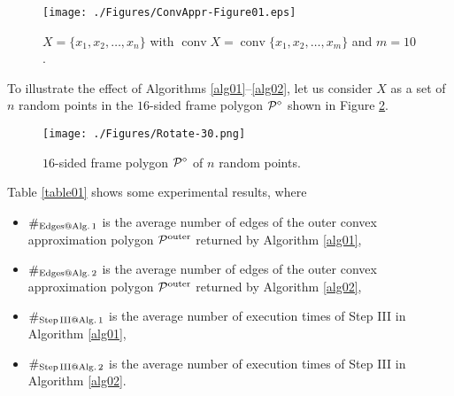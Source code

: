 \documentclass[12pt]{article}
\DeclareMathOperator{\conv}{conv}
\begin{document}
\begin{figure}[ht]
	\centering
	\texttt{[image: ./Figures/ConvAppr-Figure01.eps]}
	\caption{$X = \{x_1, x_2, \dots, x_n\}$ with $\conv X = \conv\{x_1, x_2, \dots, x_m\}$ and $m = 10$.}
	\label{Figure01}
\end{figure}



To illustrate the effect of Algorithms \ref{alg01}--\ref{alg02}, let us consider $X$ as a set of $n$ random points in the $16$-sided frame polygon ${\cal P}^\diamond$ shown in Figure \ref{Figure02}.

\begin{figure}[ht]
	\centering
    \texttt{[image: ./Figures/Rotate-30.png]}
	\caption{$16$-sided frame polygon ${\cal P}^\diamond$ of $n$ random points.}
	\label{Figure02}
\end{figure}

\medskip
Table \ref{table01} shows some experimental results, where
\begin{itemize}
\item $\#_{\rm Edges@ Alg.\, 1}$ is the average number of edges of the outer convex approximation polygon ${\cal P}^{\rm outer}$ returned by Algorithm \ref{alg01},
\item $\#_{\rm Edges@ Alg.\, 2}$ is the average number of edges of the outer convex approximation polygon ${\cal P}^{\rm outer}$ returned by Algorithm \ref{alg02},
\item $\#_{\rm Step\, III @ Alg.\, 1}$ is the average number of execution times of Step III in Algorithm \ref{alg01},
\item $\#_{\rm Step\, III @ Alg.\, 2}$ is the average number of execution times of Step III in Algorithm \ref{alg02}.
\end{itemize}
\end{document}
